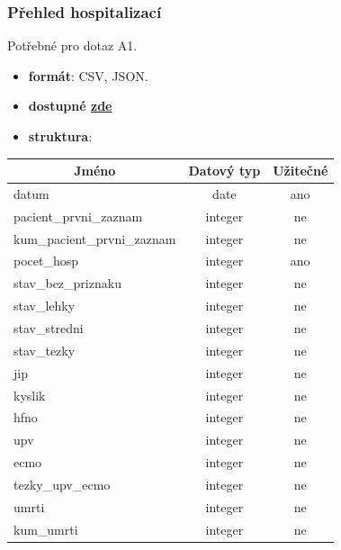 \documentclass[12pt]{article}
\begin{document}
\subsubsection*{Přehled hospitalizací}
Potřebné pro dotaz A1.
\begin{itemize}
    \item \textbf{formát}: CSV, JSON.
    \item \textbf{dostupné \href{https://onemocneni-aktualne.mzcr.cz/api/v2/covid-19/hospitalizace.csv}{zde}}
    \item \textbf{struktura}:
\end{itemize}
        \begin{center}
            \begin{tabular}{ |l|c|c| }
                \hline
                \multicolumn{1}{|c|}{Jméno} & Datový typ & Užitečné \\
                \hline
                \hline
                datum & date & ano \\
                \hline
                pacient\_prvni\_zaznam & integer & ne \\
                \hline
                kum\_pacient\_prvni\_zaznam & integer & ne \\
                \hline
                pocet\_hosp & integer & ano \\
                \hline
                stav\_bez\_priznaku & integer & ne \\
                \hline
                stav\_lehky & integer & ne \\
                \hline
                stav\_stredni & integer & ne \\
                \hline
                stav\_tezky & integer & ne \\
                \hline
                jip & integer & ne \\
                \hline
                kyslik & integer & ne \\
                \hline
                hfno & integer & ne \\
                \hline
                upv & integer & ne \\
                \hline
                ecmo & integer & ne \\
                \hline
                tezky\_upv\_ecmo & integer & ne \\
                \hline
                umrti & integer & ne \\
                \hline
                kum\_umrti & integer & ne \\
                \hline
            \end{tabular}
        \end{center}
\end{document}
